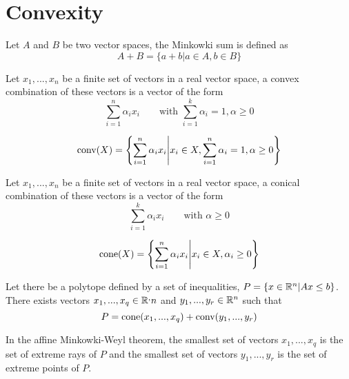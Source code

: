 \chapter{Convexity}

\begin{definition}
    Let $A$ and $B$ be two vector spaces, the Minkowki sum is defined as
    \[
        A + B = \{ a + b | a\in A, b\in B \}
    \]
\end{definition}

\begin{definition}
    Let $x_1,...,x_n$ be a finite set of vectors in a real vector space, a convex combination of these vectors is a vector of the form 
    \[
        \sum_{i=1}^n\alpha_ix_i\qquad\textrm{with } \sum_{i=1}^k\alpha_i = 1, \alpha\ge 0
    \]
\end{definition}

\begin{definition}
    \[
        \textrm{conv}(X) = \left\{ \sum_{i=1}^n\alpha_ix_i \middle| x_i\in X, \sum_{i=1}^n\alpha_i = 1, \alpha\ge 0 \right\}
    \]
\end{definition}

\begin{definition}
    Let $x_1,...,x_n$ be a finite set of vectors in a real vector space, a conical combination of these vectors is a vector of the form 
    \[
        \sum_{i=1}^k \alpha_ix_i \qquad\textrm{with } \alpha\ge 0
    \]
\end{definition}

\begin{definition}
\[
    \textrm{cone}(X) = \left\{ \sum_{i=1}^n \alpha_ix_i \middle| x_i\in X, \alpha_i \ge 0 \right \}
\]
\end{definition}

\begin{theorem}
    Let there be a polytope defined by a set of inequalities, $P = \{ x\in\mathbb R^n | Ax\le b \}$. There exists vectors $x_1,...,x_q\in\mathbb R^,n$ and $y_1,...,y_r\in\mathbb R^n$ such that
    \[
        P = \textrm{cone}(x_1,...,x_q) + \textrm{conv}(y_1,...,y_r)
    \]
\end{theorem}

\begin{observation}
    In the affine Minkowki-Weyl theorem, the smallest set of vectors $x_1,...,x_q$ is the set of extreme rays of $P$ and the smallest set of vectors $y_1,...,y_r$ is the set of extreme points of $P$. 
\end{observation}